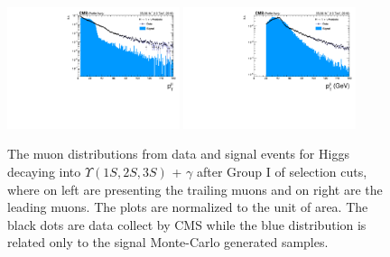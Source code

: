 \begin{figure}[!htbp]
\begin{center}
\includegraphics[width=0.45\textwidth]{figures_and_tables/outputPlots/HtoUpsilon_Cat0_ZZZZZ/au/data_x_mc/noKinCuts/h_noKin_TrailingMu_pt}\hspace*{1.cm}
\includegraphics[width=0.45\textwidth]{figures_and_tables/outputPlots/HtoUpsilon_Cat0_ZZZZZ/au/data_x_mc/noKinCuts/h_noKin_LeadingMu_pt}
\end{center}\vspace*{-.5cm}
\caption{The \PT muon distributions from data and signal events for Higgs decaying into $\Upsilon(1S,2S,3S)$ + $\gamma$ after Group I of selection cuts, where on left are presenting the trailing muons and on right are the leading muons. The plots are normalized to the unit of area. The black dots are data collect by CMS while the blue distribution is related only to the signal Monte-Carlo generated samples.}
\label{fig:pTMuons_HtoUpsilon_Cat0}
\end{figure}


